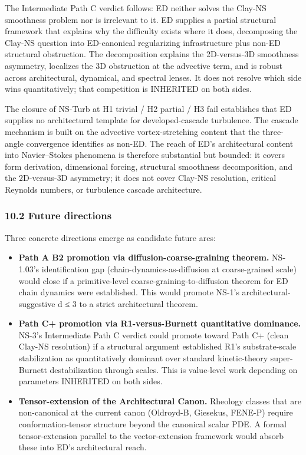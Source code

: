 \documentclass[
  11pt,a4paper]{article}
\providecommand{\tightlist}{%
  \setlength{\itemsep}{0pt}\setlength{\parskip}{0pt}}
\begin{document}
The Intermediate Path C verdict follows: ED neither solves the Clay-NS
smoothness problem nor is irrelevant to it. ED supplies a partial
structural framework that explains why the difficulty exists where it
does, decomposing the Clay-NS question into ED-canonical regularizing
infrastructure plus non-ED structural obstruction. The decomposition
explains the 2D-versus-3D smoothness asymmetry, localizes the 3D
obstruction at the advective term, and is robust across architectural,
dynamical, and spectral lenses. It does not resolve which side wins
quantitatively; that competition is INHERITED on both sides.

The closure of NS-Turb at H1 trivial / H2 partial / H3 fail establishes
that ED supplies no architectural template for developed-cascade
turbulence. The cascade mechanism is built on the advective
vortex-stretching content that the three-angle convergence identifies as
non-ED. The reach of ED's architectural content into Navier--Stokes
phenomena is therefore substantial but bounded: it covers form
derivation, dimensional forcing, structural smoothness decomposition,
and the 2D-versus-3D asymmetry; it does not cover Clay-NS resolution,
critical Reynolds numbers, or turbulence cascade architecture.

\subsubsection{10.2 Future directions}\label{future-directions}

Three concrete directions emerge as candidate future arcs:

\begin{itemize}
\tightlist
\item
  \textbf{Path A B2 promotion via diffusion-coarse-graining theorem.}
  NS-1.03's identification gap (chain-dynamics-as-diffusion at
  coarse-grained scale) would close if a primitive-level
  coarse-graining-to-diffusion theorem for ED chain dynamics were
  established. This would promote NS-1's architectural-suggestive d ≤ 3
  to a strict architectural theorem.
\item
  \textbf{Path C+ promotion via R1-versus-Burnett quantitative
  dominance.} NS-3's Intermediate Path C verdict could promote toward
  Path C+ (clean Clay-NS resolution) if a structural argument
  established R1's substrate-scale stabilization as quantitatively
  dominant over standard kinetic-theory super-Burnett destabilization
  through scales. This is value-level work depending on parameters
  INHERITED on both sides.
\item
  \textbf{Tensor-extension of the Architectural Canon.} Rheology classes
  that are non-canonical at the current canon (Oldroyd-B, Giesekus,
  FENE-P) require conformation-tensor structure beyond the canonical
  scalar PDE. A formal tensor-extension parallel to the vector-extension
  framework would absorb these into ED's architectural reach.
\end{itemize}
\end{document}
